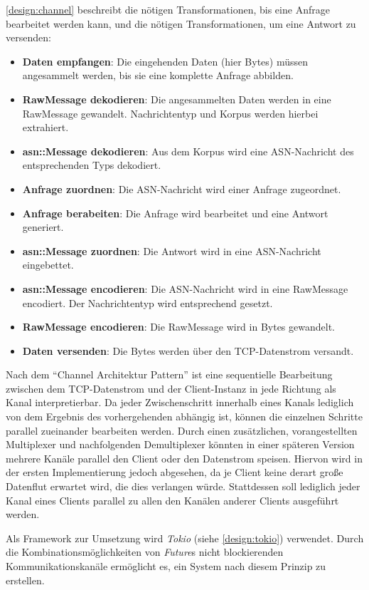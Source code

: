 \autoref{design:channel} beschreibt die nötigen Transformationen, bis eine Anfrage bearbeitet werden kann, und die nötigen Transformationen, um eine Antwort zu versenden:
\begin{itemize}
	\item \textbf{Daten empfangen}: Die eingehenden Daten (hier Bytes) müssen angesammelt werden, bis sie eine komplette Anfrage abbilden.
	\item \textbf{RawMessage dekodieren}: Die angesammelten Daten werden in eine RawMessage gewandelt. Nachrichtentyp und Korpus werden hierbei extrahiert.
	\item \textbf{asn::Message dekodieren}: Aus dem Korpus wird eine ASN-Nachricht des entsprechenden Typs dekodiert.
	\item \textbf{Anfrage zuordnen}: Die ASN-Nachricht wird einer Anfrage zugeordnet.
	\item \textbf{Anfrage berabeiten}: Die Anfrage wird bearbeitet und eine Antwort generiert.
	\item \textbf{asn::Message zuordnen}: Die Antwort wird in eine ASN-Nachricht eingebettet.
	\item \textbf{asn::Message encodieren}: Die ASN-Nachricht wird in eine RawMessage encodiert. Der Nachrichtentyp wird entsprechend gesetzt.
	\item \textbf{RawMessage encodieren}: Die RawMessage wird in Bytes gewandelt.
	\item \textbf{Daten versenden}: Die Bytes werden über den TCP-Datenstrom versandt.
\end{itemize}

Nach dem \enquote{Channel Architektur Pattern} ist eine sequentielle Bearbeitung zwischen dem TCP-Datenstrom und der Client-Instanz in jede Richtung als Kanal interpretierbar.
Da jeder Zwischenschritt innerhalb eines Kanals lediglich von dem Ergebnis des vorhergehenden abhängig ist, können die einzelnen Schritte parallel zueinander bearbeiten werden.
\todo{}
Durch einen zusätzlichen, vorangestellten Multiplexer und nachfolgenden Demultiplexer könnten in einer späteren Version mehrere Kanäle parallel den Client oder den Datenstrom speisen.
Hiervon wird in der ersten Implementierung jedoch abgesehen, da je Client keine derart große Datenflut erwartet wird, die dies verlangen würde.
Stattdessen soll lediglich jeder Kanal eines Clients parallel zu allen den Kanälen anderer Clients ausgeführt werden.

Als Framework zur Umsetzung wird \textit{Tokio} (siehe \autoref{design:tokio}) verwendet.
Durch die Kombinationsmöglichkeiten von \textit{Future}s nicht blockierenden Kommunikationskanäle ermöglicht es, ein System nach diesem Prinzip zu erstellen.

